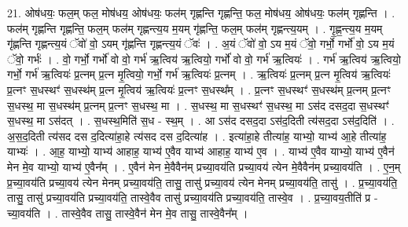 \documentclass[17pt]{extarticle}
\begin{document}
21. ओष॑धयः॒ फल॒म् फल॒ मोष॑धय॒ ओष॑धयः॒ फल॑म् गृह्णन्ति गृह्णन्ति॒ फल॒ मोष॑धय॒ ओष॑धयः॒ फल॑म् गृह्णन्ति । . फल॑म् गृह्णन्ति गृह्णन्ति॒ फल॒म् फल॑म् गृह्णन्त्य॒य म॒यम् गृ॑ह्णन्ति॒ फल॒म् फल॑म् गृह्णन्त्य॒यम् । . गृ॒ह्ण॒न्त्य॒य म॒यम् गृ॑ह्णन्ति गृह्णन्त्य॒यं ॅवो॑ वो॒ ऽयम् गृ॑ह्णन्ति गृह्णन्त्य॒यं ॅवः॑ । . अ॒यं ॅवो॑ वो॒ ऽय म॒यं ॅवो॒ गर्भो॒ गर्भो॑ वो॒ ऽय म॒यं ॅवो॒ गर्भः॑ । . वो॒ गर्भो॒ गर्भो॑ वो वो॒ गर्भ॑ ऋ॒त्विय॑ ऋ॒त्वियो॒ गर्भो॑ वो वो॒ गर्भ॑ ऋ॒त्वियः॑ । . गर्भ॑ ऋ॒त्विय॑ ऋ॒त्वियो॒ गर्भो॒ गर्भ॑ ऋ॒त्वियः॑ प्र॒त्नम् प्र॒त्न मृ॒त्वियो॒ गर्भो॒ गर्भ॑ ऋ॒त्वियः॑ प्र॒त्नम् । . ऋ॒त्वियः॑ प्र॒त्नम् प्र॒त्न मृ॒त्विय॑ ऋ॒त्वियः॑ प्र॒त्नꣳ स॒धस्थꣳ॑ स॒धस्थ॑म् प्र॒त्न मृ॒त्विय॑ ऋ॒त्वियः॑ प्र॒त्नꣳ स॒धस्थ᳚म् । . प्र॒त्नꣳ स॒धस्थꣳ॑ स॒धस्थ॑म् प्र॒त्नम् प्र॒त्नꣳ स॒धस्थ॒ मा स॒धस्थ॑म् प्र॒त्नम् प्र॒त्नꣳ स॒धस्थ॒ मा । . स॒धस्थ॒ मा स॒धस्थꣳ॑ स॒धस्थ॒ मा ऽस॑द दसद॒दा स॒धस्थꣳ॑ स॒धस्थ॒ मा ऽस॑दत् । . स॒धस्थ॒मिति॑ स॒ध - स्थ॒म् । . आ ऽस॑द दसद॒दा ऽस॑द॒दिती त्य॑सद॒दा ऽस॑द॒दिति॑ । . अ॒स॒द॒दिती त्य॑सद दस द॒दित्या॑हा॒हे त्य॑सद दस द॒दित्या॑ह । . इत्या॑हा॒हे तीत्या॑ह॒ याभ्यो॒ याभ्य॑ आ॒हे तीत्या॑ह॒ याभ्यः॑ । . आ॒ह॒ याभ्यो॒ याभ्य॑ आहाह॒ याभ्य॑ ए॒वैव याभ्य॑ आहाह॒ याभ्य॑ ए॒व । . याभ्य॑ ए॒वैव याभ्यो॒ याभ्य॑ ए॒वैन॑ मेन मे॒व याभ्यो॒ याभ्य॑ ए॒वैन᳚म् । . ए॒वैन॑ मेन मे॒वैवैन॑म् प्रच्या॒वय॑ति प्रच्या॒वय॑ त्येन मे॒वैवैन॑म् प्रच्या॒वय॑ति । . ए॒न॒म् प्र॒च्या॒वय॑ति प्रच्या॒वय॑ त्येन मेनम् प्रच्या॒वय॑ति॒ तासु॒ तासु॑ प्रच्या॒वय॑ त्येन मेनम् प्रच्या॒वय॑ति॒ तासु॑ । . प्र॒च्या॒वय॑ति॒ तासु॒ तासु॑ प्रच्या॒वय॑ति प्रच्या॒वय॑ति॒ तास्वे॒वैव तासु॑ प्रच्या॒वय॑ति प्रच्या॒वय॑ति॒ तास्वे॒व । . प्र॒च्या॒वय॒तीति॑ प्र - च्या॒वय॑ति । . तास्वे॒वैव तासु॒ तास्वे॒वैन॑ मेन मे॒व तासु॒ तास्वे॒वैन᳚म् । \newline
\end{document}
